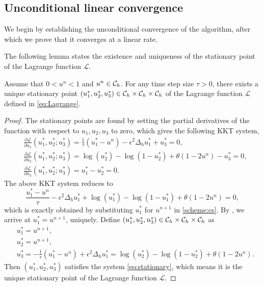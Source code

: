 \subsection{Unconditional linear convergence}
We begin by establishing the unconditional convergence of the algorithm, after which we prove that it converges at a linear rate.
\par The following lemma states the existence and uniqueness of the stationary point of the Lagrange function $\mathcal{L}$. 
\begin{lemma}
    Assume that $0<u^n<1$ and $u^n \in {\mathcal{C}_h}$. For any time step size $\tau>0$, there exists a unique stationary point $(u_1^*,u_2^*,u_3^*)\in {\mathcal{C}_h} \times {\mathcal{C}_h} \times {\mathcal{C}_h}$ of the Lagrange function $\mathcal{L}$ defined in \eqref{eq:Lagrange}.
\end{lemma}
\begin{proof}
    The stationary points are found by setting the partial derivatives of the function with respect to $u_1,u_2,u_3$ to zero, 
    which gives the following KKT system,
    \begin{subequations}\label{eq:stationary}
        \begin{align}
        &\frac{\partial \mathcal{L}}{\partial u_1}(u_1^*,u_2^*;u_3^*)
        =\frac{1}{\tau}(u_1^*-u^n)-\epsilon^2\Delta_hu_1^*+u_3^*=0,\\
        &\frac{\partial \mathcal{L}}{\partial u_2}(u_1^*,u_2^*;u_3^*)
        =\log(u_2^*)-\log(1-u_2^*)+\theta(1-2u^n)-u_3^*=0,\\
        &\frac{\partial \mathcal{L}}{\partial u_3}
        (u_1^*,u_2^*;u_3^*)
        =u_1^*-u_2^*=0.
        \end{align}
    \end{subequations}
    The above KKT system reduces to
    \begin{equation}
        \frac{u_1^*-u^n}{\tau}-\epsilon^2\Delta_hu_1^*
    +\log(u_1^*)-\log(1-u_1^*)+\theta(1-2u^n)=0,
    \end{equation}
    which is exactly obtained by substituting $u_1^*$ for $u^{n+1}$ in \eqref{scheme:cs}. By , we arrive at $u_1^*=u^{n+1}$, uniquely. 
    Define $(u_1^*,u_2^*,u_3^*)\in {\mathcal{C}_h} \times {\mathcal{C}_h} \times {\mathcal{C}_h}$ as
    \begin{subequations}
        \begin{align}
            &u_1^*=u^{n+1},\\
            &u_2^*=u^{n+1},\\
            &u_3^*=-\frac{1}{\tau}(u_1^*-u^n)+\epsilon^2\Delta_hu_1^*=\log(u_2^*)-\log(1-u_2^*)+\theta(1-2u^n).
        \end{align}
    \end{subequations}
    Then $(u_1^*,u_2^*,u_3^*)$ satisfies the system \eqref{eq:stationary}, which means it is the unique stationary point of the Lagrange function $\mathcal{L}$.
\end{proof}
